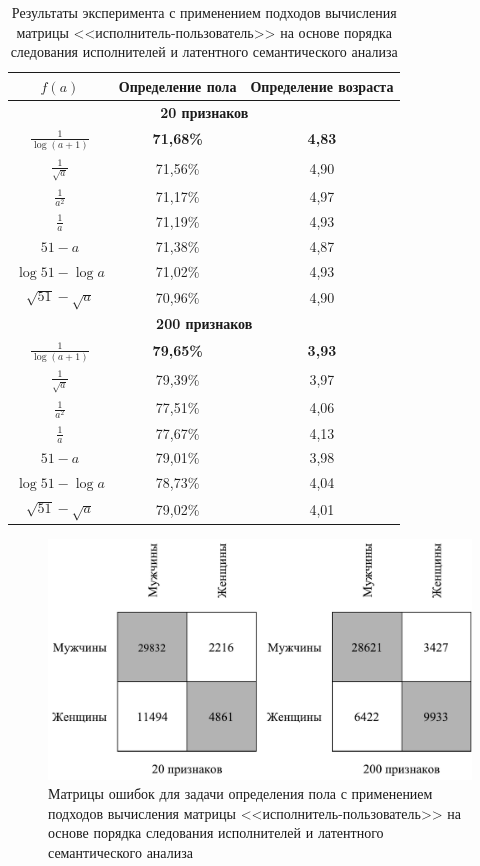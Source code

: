 \begin{table}[!h]
    \caption{Результаты эксперимента с применением подходов
             вычисления матрицы <<исполнитель-пользователь>>
             на основе порядка следования исполнителей 
             и латентного семантического анализа}
    \label{tab:order_lsa}
\centering
\begin{tabular}{|c|c|c|}\hline
    \boldmath$f(a)$ & \textbf{Определение пола} & \textbf{Определение возраста} \\\hline
    \multicolumn{3}{|c|}{\textbf{20 признаков}} \\\hline
    $\frac{1}{\log(a + 1)}$ & \textbf{71,68\%} & \textbf{4,83} \\\hline
    $\frac{1}{\sqrt{a}}$ & 71,56\% & 4,90 \\\hline
    $\frac{1}{a^2}$ & 71,17\% & 4,97 \\\hline
    $\frac{1}{a}$ & 71,19\% & 4,93 \\\hline
    $51 - a$ & 71,38\% & 4,87 \\\hline
    $\log{51} - \log{a}$ & 71,02\% & 4,93 \\\hline
    $\sqrt{51} - \sqrt{a}$ & 70,96\% & 4,90 \\\hline
    \multicolumn{3}{|c|}{\textbf{200 признаков}} \\\hline
    $\frac{1}{\log(a + 1)}$ & \textbf{79,65\%} & \textbf{3,93} \\\hline
    $\frac{1}{\sqrt{a}}$ & 79,39\% & 3,97 \\\hline
    $\frac{1}{a^2}$ & 77,51\% & 4,06 \\\hline
    $\frac{1}{a}$ & 77,67\% & 4,13 \\\hline
    $51 - a$ & 79,01\% & 3,98 \\\hline
    $\log{51} - \log{a}$ & 78,73\% & 4,04 \\\hline
    $\sqrt{51} - \sqrt{a}$ & 79,02\% & 4,01 \\\hline
\end{tabular}
\end{table}

\begin{figure}[!h]
\caption{Матрицы ошибок для задачи определения пола с
         применением подходов вычисления матрицы 
         <<исполнитель-пользователь>> на основе порядка следования
         исполнителей и латентного семантического анализа}
\label{fig:order_lsa_conf}
\centering
\includegraphics[scale=0.8]{figs/order-lsa-confusion.pdf}
\end{figure}

